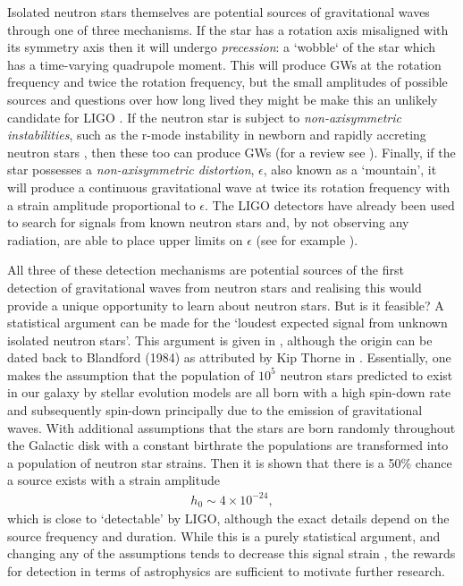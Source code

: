 Isolated neutron stars themselves are potential sources of gravitational waves
through one of three mechanisms. If the star has a rotation axis misaligned
with its symmetry axis then it will undergo \emph{precession}: a `wobble` of
the star which has a time-varying quadrupole moment. This will produce GWs at
the rotation frequency and twice the rotation frequency, but the small
amplitudes of possible sources and questions over how long lived they might be
make this an unlikely candidate for LIGO \citep{Jones2002}. If the neutron star
is subject to \emph{non-axisymmetric instabilities}, such as the r-mode
instability in newborn and rapidly accreting neutron stars
\citep{andersson2001r}, then these too can produce GWs (for a review see
\citet{andersson2003gravitational}).  Finally, if the star possesses a
\emph{non-axisymmetric distortion}, $\epsilon$, also known as a `mountain', it
will produce a continuous gravitational wave at twice its rotation frequency
with a strain amplitude proportional to $\epsilon$. The LIGO detectors have
already been used to search for signals from known neutron stars and, by not
observing any radiation, are able to place upper limits on $\epsilon$ (see for
example \citet{abbott2008beating, abadie2011beating}).

All three of these detection mechanisms are potential sources of the first
detection of gravitational waves from neutron stars and realising this would
provide a unique opportunity to learn about neutron stars. But is it feasible?
A statistical argument can be made for the `loudest expected signal from
unknown isolated neutron stars'. This argument is given in
\citet{abbott2007searches}, although the origin can be dated back to Blandford
(1984) as attributed by Kip Thorne in \citet{Hawking1989}. Essentially, one
makes the assumption that the population of $10^{5}$ neutron stars predicted to
exist in our galaxy by stellar evolution models are all born with a high
spin-down rate and subsequently spin-down principally due to the emission of
gravitational waves. With additional assumptions that the stars are born
randomly throughout the Galactic disk with a constant birthrate the populations
are transformed into a population of neutron star strains. Then it is shown
that there is a 50\% chance a source exists with a strain amplitude
\begin{align}
h_0 \sim 4 \times 10^{-24},
\end{align}
which is close to `detectable' by LIGO, although the exact details depend on the
source frequency and duration. While this is a purely statistical argument, and
changing any of the assumptions tends to decrease this signal strain
\citep{Prix2009}, the rewards for detection in terms of astrophysics are
sufficient to motivate further research.

